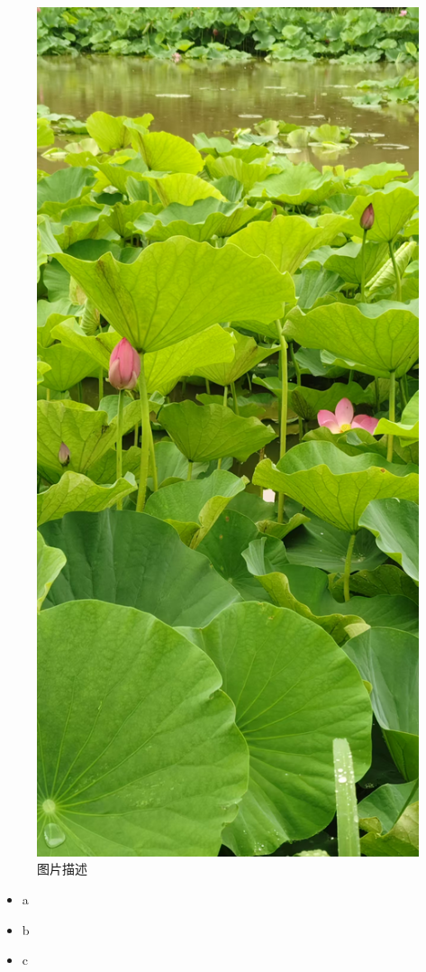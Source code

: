 \documentclass[12pt,UTF8]{ctexbook}
\begin{document}
\begin{figure}[htbp]
	\centering
	\includegraphics[width=0.7\linewidth]{1}
	\caption{图片描述}
	\label{fig:1}
\end{figure}

\begin{itemize}[leftmargin=2cm]
	\item a
	\item b
	\item c
\end{itemize}

\backmatter
\end{document}
